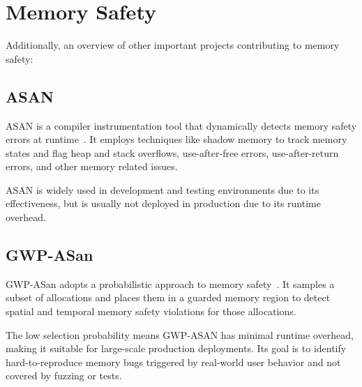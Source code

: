 \section{Memory Safety}
\label{sec:related-memory-safety}

Additionally, an overview of other important projects contributing to memory safety:

\subsection{ASAN}
\label{subsec:related-asan}

\ac{ASAN} is a compiler instrumentation tool that dynamically detects memory safety errors at runtime~\cite{serebryany2012addresssanitizer}.
It employs techniques like shadow memory to track memory states and flag heap and stack overflows, use-after-free errors, use-after-return errors, and other memory related issues.

\ac{ASAN} is widely used in development and testing environments due to its effectiveness, but is usually not deployed in production due to its runtime overhead.

\subsection{GWP-ASan}
\label{subsec:gwp-asan}

GWP-ASan adopts a probabilistic approach to memory safety~\cite{serebryany2023gwp}.
It samples a subset of allocations and places them in a guarded memory region to detect spatial and temporal memory safety violations for those allocations.

The low selection probability means GWP-ASAN has minimal runtime overhead, making it suitable for large-scale production deployments.
Its goal is to identify hard-to-reproduce memory bugs triggered by real-world user behavior and not covered by fuzzing or tests.
